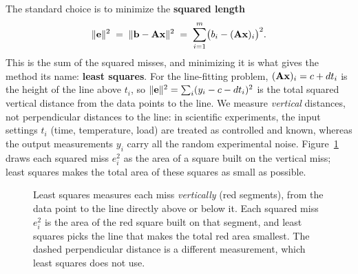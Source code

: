 The standard choice is to minimize the \textbf{squared length}
\[
  \lVert\mathbf{e}\rVert^2 \;=\; \lVert\mathbf{b}-\mathbf{A}\mathbf{x}\rVert^2
  \;=\; \sum_{i=1}^{m} \bigl(b_i - (\mathbf{A}\mathbf{x})_i\bigr)^2 .
\]
This is the sum of the squared misses, and minimizing it is what gives the method its name:
\textbf{least squares}. For the line-fitting problem, $(\mathbf{A}\mathbf{x})_i = c+dt_i$ is the height
of the line above $t_i$, so $\lVert\mathbf{e}\rVert^2 = \sum_i (y_i - c - d t_i)^2$ is the total squared
vertical distance from the data points to the line. We measure \emph{vertical}
distances, not perpendicular distances to the line: in scientific experiments, the input settings
$t_i$ (time, temperature, load) are treated as controlled and known, whereas the output
measurements $y_i$ carry all the random experimental noise.
Figure~\ref{ch19:squared-misses} draws each squared miss $e_i^2$ as the area of a square built on
the vertical miss; least squares makes the total area of these squares as small as possible.

\begin{figure}[htbp]
\centering
{}
\caption{Least squares measures each miss \emph{vertically} (red segments), from the data point
to the line directly above or below it. Each squared miss $e_i^2$ is the area of the red square
built on that segment, and least squares picks the line that makes the total red area smallest.
The dashed perpendicular distance is a different measurement, which least squares does not use.}
\label{ch19:squared-misses}
\end{figure}


